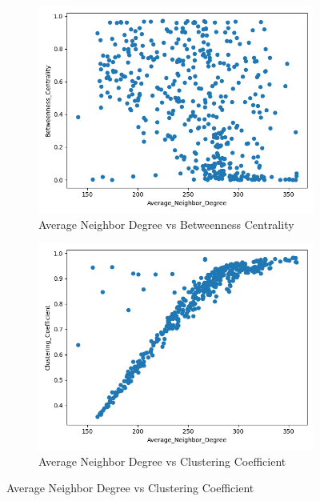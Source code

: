 \begin{figure}[H]
     \centering
     \begin{subfigure}[b]{0.3\textwidth}
         \centering
         \includegraphics[width=\textwidth]{images/comparison/ALL/relationship_Average_Neighbor_Degree_vs_Betweenness_Centrality_ALL.png}
         \caption{Average Neighbor Degree vs Betweenness Centrality}
     \end{subfigure}
     \hfill
     \begin{subfigure}[b]{0.3\textwidth}
         \centering
         \includegraphics[width=\textwidth]{images/comparison/ALL/relationship_Average_Neighbor_Degree_vs_Clustering_Coefficient_ALL.png}
         \caption{Average Neighbor Degree vs Clustering Coefficient}

\end{subfigure}
\end{figure}
